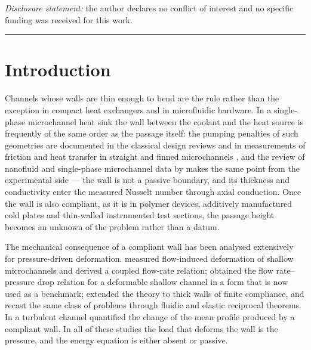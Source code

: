 \documentclass[11pt,a4paper]{article}
\begin{document}
\vspace{2pt}
\noindent\textit{Disclosure statement:} the author declares no
conflict of interest and no specific funding was received for this work.

\vspace{4pt}
\noindent\rule{\textwidth}{0.4pt}


\section{Introduction}
\label{sec:intro}

Channels whose walls are thin enough to bend are the rule rather than the
exception in compact heat exchangers and in microfluidic hardware. In a
single-phase microchannel heat sink the wall between the coolant and the heat
source is frequently of the same order as the passage itself: the pumping
penalties of such geometries are documented in the classical design reviews
\citep{garimella2004single} and in measurements of friction and heat transfer
in straight and finned microchannels \citep{dey2012frictional,
gorasiya2018single,ruiz2015experimental,eltaweel2023experimental,
han2026experimental}, and the review of nanofluid and single-phase
microchannel data by \citet{eneren2022experiments} makes the same point from
the experimental side --- the wall is not a passive boundary, and its
thickness and conductivity enter the measured Nusselt number through axial
conduction. Once the wall is also compliant, as it is in polymer devices,
additively manufactured cold plates and thin-walled instrumented test
sections, the passage height becomes an unknown of the problem rather than a
datum.

The mechanical consequence of a compliant wall has been analysed
extensively for pressure-driven deformation. \citet{gervais2006flow}
measured flow-induced deformation of shallow microchannels and derived a
coupled flow-rate relation; \citet{christov2018flow} obtained the
flow rate--pressure drop relation for a deformable shallow channel in a form
that is now used as a benchmark; \citet{wang2019theory} extended the theory to
thick walls of finite compliance, and \citet{boyko2022flow} recast the same
class of problems through fluidic and elastic reciprocal theorems. In a
turbulent channel \citet{zhang2017deformation} quantified the change of the
mean profile produced by a compliant wall. In all of these studies the load
that deforms the wall is the pressure, and the energy equation is either
absent or passive.
\end{document}
